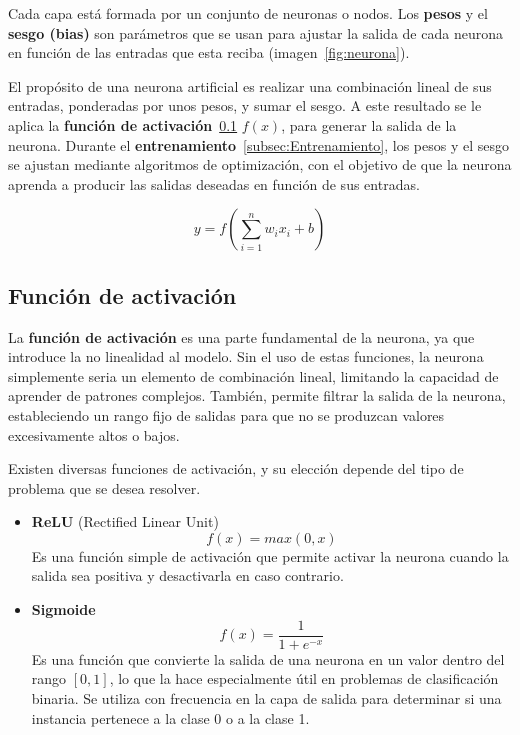 
Cada capa está formada por un conjunto de neuronas o nodos. Los \textbf{pesos} y el \textbf{sesgo (bias)} son parámetros que se usan para ajustar la salida de cada neurona en función de las entradas que esta reciba (imagen~\ref{fig:neurona}).


El propósito de una neurona artificial es realizar una combinación lineal de sus entradas, ponderadas por unos pesos, y sumar el sesgo. A este resultado se le aplica la \textbf{función de activación}~\ref{subsec:FuncionActivacion} \(f(x)\), para generar la salida de la neurona. Durante el \textbf{entrenamiento}~\ref{subsec:Entrenamiento}, los pesos y el sesgo se ajustan mediante algoritmos de optimización, con el objetivo de que la neurona aprenda a producir las salidas deseadas en función de sus entradas.

\[y=f(\sum_{i=1}^{n}{w_ix_i + b})\]

\subsection{Función de activación}
\label{subsec:FuncionActivacion}
La \textbf{función de activación} es una parte fundamental de la neurona, ya que introduce la no linealidad al modelo. Sin el uso de estas funciones, la neurona simplemente seria un elemento de combinación lineal, limitando la capacidad de aprender de patrones complejos. También, permite filtrar la salida de la neurona, estableciendo un rango fijo de salidas para que no se produzcan valores excesivamente altos o bajos.

Existen diversas funciones de activación, y su elección depende del tipo de problema que se desea resolver.
\begin{itemize}
    \item \textbf{ReLU} (Rectified Linear Unit)
        \[f(x)=max(0, x)\]
        Es una función simple de activación que permite activar la neurona cuando la salida sea positiva y desactivarla en caso contrario.
    \item \textbf{Sigmoide}
        \[f(x)=\frac{1}{1 + e^{-x}}\]
        Es una función que convierte la salida de una neurona en un valor dentro del rango \([0,1]\), lo que la hace especialmente útil en problemas de clasificación binaria. Se utiliza con frecuencia en la capa de salida para determinar si una instancia pertenece a la clase 0 o a la clase 1.
\end{itemize}

